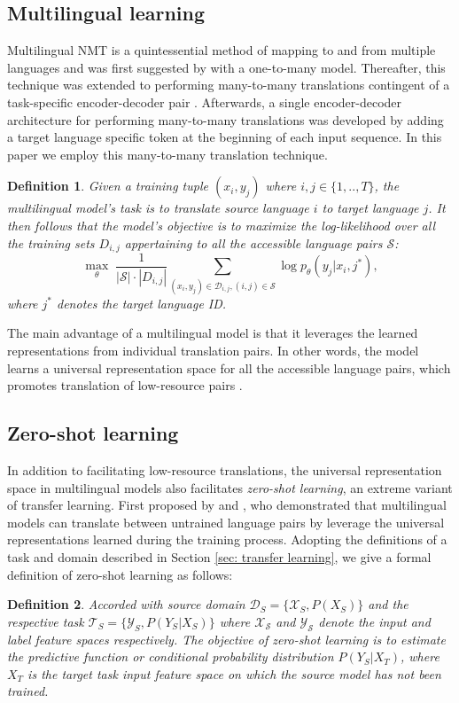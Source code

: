 \documentclass[11pt,a4paper]{article}
\newtheorem{definition}{Definition}
\begin{document}
\subsection{Multilingual learning}
Multilingual NMT is a quintessential method of mapping to and from multiple languages and was first suggested by \citet{dong2015multi} with a one-to-many model. Thereafter, this technique was extended to performing many-to-many translations contingent of a task-specific encoder-decoder pair \citep{luong2015multi, firat2016zero}. Afterwards, a single encoder-decoder architecture for performing many-to-many translations was developed \citep{johnson2017google, ha2017effective} by adding a target language specific token at the beginning of each input sequence. In this paper we employ this many-to-many translation technique. 
\begin{definition} 
Given a training tuple $(x_{i}, y_{j})$ where $i,j \in \{1,..,T\}$, the multilingual model's task is to translate source language $i$ to target language $j$. It then follows that the model's objective is to maximize the log-likelihood over all the training sets $D_{i,j}$ appertaining to all the accessible language pairs $\mathcal{S}$:
\begin{equation}
    \max_{\theta}\;\frac{1}{|\mathcal{S}|\cdot|D_{i,j}|}\sum_{(x_{i},y_{j})\in \mathcal{D}_{i,j}, (i,j)\in \mathcal{S}} \log p_{\theta}(y_{j}|x_{i},j^{*}),
\end{equation}
where $j^{*}$ denotes the target language ID.
\end{definition}
The main advantage of a multilingual model is that it leverages the learned representations from individual translation pairs. In other words, the model learns a universal representation space for all the accessible language pairs, which promotes translation of low-resource pairs \citep{firat2016multi, gu2018universal}. 

\subsection{Zero-shot learning}
In addition to facilitating low-resource translations, the universal representation space in multilingual models also facilitates \emph{zero-shot learning}, an extreme variant of transfer learning. First proposed by \citet{johnson2017google} and \citet{ha2017effective}, who demonstrated that multilingual models can translate between untrained language pairs by leverage the universal representations learned during the training process. Adopting the definitions of a task and domain described in Section \ref{sec:  transfer learning}, we give a formal definition of zero-shot learning as follows:
\begin{definition} 
Accorded with source domain $\mathcal{D}_{S} = \{\mathcal{X}_{S}, P(X_{S})\}$ and the respective task $\mathcal{T}_{S} = \{\mathcal{Y}_{S}, P(Y_{S}|X_{S})\}$ where $\mathcal{X_{S}}$ and $\mathcal{Y_{S}}$ denote the input and label feature spaces respectively. The objective of zero-shot learning is to estimate the predictive function or conditional probability distribution $P(Y_{S}|X_{T})$, where $X_{T}$ is the target task input feature space on which the source model has not been trained.
\end{definition}
\end{document}
